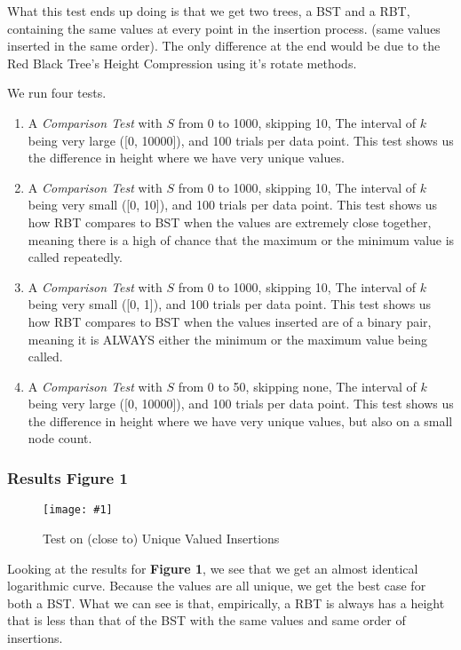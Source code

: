 \documentclass{article}
\newcommand{\figureInsetScaled}[3]
{
    \FloatBarrier{}
    \figureRaw{#1}{#2}{#3}
    \FloatBarrier{}
}
\newcommand{\figureRaw}[3]
{
    \begin{figure}[ht!]
        \centering
        \texttt{[image: \#1]}
        \caption{#2}
    \end{figure}
}
\begin{document}
What this test ends up doing is that we get two trees, a BST and a RBT, containing the same values at every point in the insertion process. (same values inserted in the same order). The only difference at the end would be due to the Red Black Tree's Height Compression using it's rotate methods.

We run four tests.
\begin{enumerate}
    \item A \textit{Comparison Test} with $S$ from 0 to 1000, skipping 10, The interval of $k$ being very large ([0, 10000]), and 100 trials per data point. This test shows us the difference in height where we have very unique values.

    \item A \textit{Comparison Test} with $S$ from 0 to 1000, skipping 10, The interval of $k$ being very small ([0, 10]), and 100 trials per data point. This test shows us how RBT compares to BST when the values are extremely close together, meaning there is a high of chance that the maximum or the minimum value is called repeatedly.

    \item A \textit{Comparison Test} with $S$ from 0 to 1000, skipping 10, The interval of $k$ being very small ([0, 1]), and 100 trials per data point. This test shows us how RBT compares to BST when the values inserted are of a binary pair, meaning it is ALWAYS either the minimum or the maximum value being called.

    \item A \textit{Comparison Test} with $S$ from 0 to 50, skipping none, The interval of $k$ being very large ([0, 10000]), and 100 trials per data point. This test shows us the difference in height where we have very unique values, but also on a small node count.
\end{enumerate}

\newpage

\subsubsection{Results Figure 1}
\figureInsetScaled{images/experiment1/Figure_1.png}{Test on (close to) Unique Valued Insertions}{0.5}

Looking at the results for \textbf{Figure 1}, we see that we get an almost identical logarithmic curve. Because the values are all unique, we get the best case for both a BST. What we can see is that, empirically, a RBT is always has a height that is less than that of the BST with the same values and same order of insertions.
\end{document}
